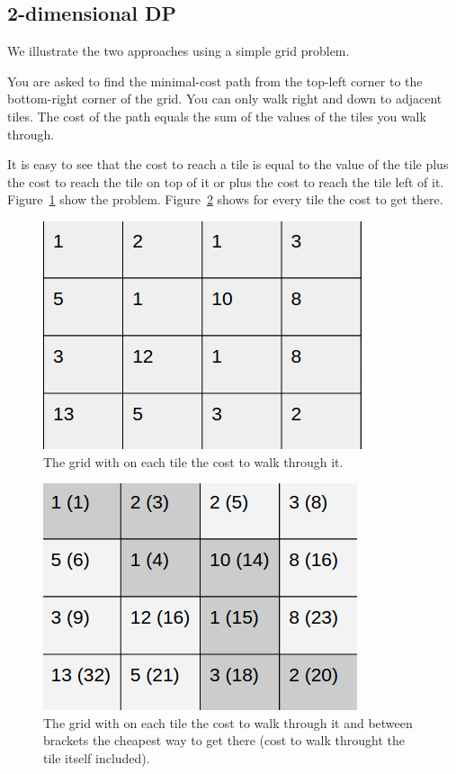 \subsection{2-dimensional DP}
We illustrate the two approaches using a simple grid problem.

You are asked to find the minimal-cost path from the top-left corner to the bottom-right corner of the grid.
You can only walk right and down to adjacent tiles. The cost of the path equals the sum of the values of the tiles you walk through.

It is easy to see that the cost to reach a tile is equal to the value of the tile plus the cost to reach the tile on top of it or plus the cost to reach the tile left of it.
Figure~\ref{image:2d-problem} show the problem. Figure~\ref{image:2d-solution} shows for every tile the cost to get there.

\begin{figure}
\label{image:2d-problem}
 \includegraphics{2d/problem.png}
 \caption{The grid with on each tile the cost to walk through it.}
\end{figure}
\begin{figure}
  \label{image:2d-solution}
 \includegraphics{2d/solution.png}
 \caption{The grid with on each tile the cost to walk through it and between brackets the cheapest way to get there (cost to walk throught the tile itself included).}
\end{figure}

